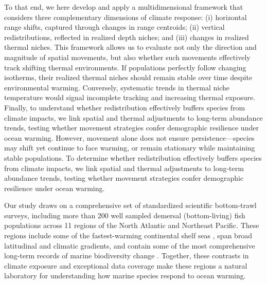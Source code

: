 \documentclass[lineno,pdflatex,sn-nature]{sn-jnl}%
\begin{document}
To that end, we here develop and apply a multidimensional framework that considers three complementary dimensions of climate response: (i) horizontal range shifts, captured through changes in range centroids; (ii) vertical redistributions, reflected in realized depth niches; and
(iii) changes in realized thermal niches. This framework allows us to evaluate not only the direction and magnitude of spatial movements, but also whether such movements effectively track shifting thermal environments. If populations perfectly follow changing isotherms, their realized thermal niches should remain stable over time despite environmental warming. Conversely, systematic trends in thermal niche temperature would signal incomplete tracking and increasing thermal exposure.
Finally, to understand whether redistribution effectively buffers species from climate impacts, we link spatial and thermal adjustments to long-term abundance trends, testing whether movement strategies confer demographic resilience under ocean warming.
However, movement alone does not ensure persistence—species may shift yet continue to face warming, or remain stationary while maintaining stable populations. To determine whether redistribution effectively buffers species from climate impacts, we link spatial and thermal adjustments to long-term abundance trends, testing whether movement strategies confer demographic resilience under ocean warming.

Our study draws on a comprehensive set of standardized scientific bottom-trawl surveys, including more than 200 well sampled demersal (bottom-living) fish populations across 11 regions of the North Atlantic and Northeast Pacific. These regions include some of the fastest-warming continental shelf seas \citep{pershing_slow_2015, song_arctic_2023}, span broad latitudinal and climatic gradients, and contain some of the most comprehensive long-term records of marine biodiversity change \citep{maureaud_are_2021, maureaud_fishglob_data_2024}. Together, these contrasts in climate exposure and exceptional data coverage make these regions a natural laboratory for understanding how marine species respond to ocean warming.
\end{document}
